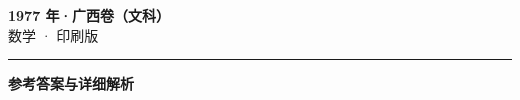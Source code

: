 \documentclass[zihao=5, a4paper]{ctexart}
\begin{document}
\begin{center}
  {\Large\bfseries 1977 年·广西卷（文科）}\\[4pt]
  {\large 数学 · 印刷版}
\end{center}
\medskip
{}

\par\bigskip\hrule\bigskip
{}
\begin{center}{\large\bfseries 参考答案与详细解析}\end{center}
\smallskip

\end{document}
